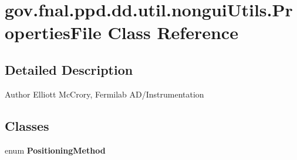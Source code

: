 \hypertarget{classgov_1_1fnal_1_1ppd_1_1dd_1_1util_1_1nonguiUtils_1_1PropertiesFile}{\section{gov.\-fnal.\-ppd.\-dd.\-util.\-nongui\-Utils.\-Properties\-File Class Reference}
\label{classgov_1_1fnal_1_1ppd_1_1dd_1_1util_1_1nonguiUtils_1_1PropertiesFile}
}


\subsection{Detailed Description}
\begin{DoxyAuthor}{Author}
Elliott Mc\-Crory, Fermilab A\-D/\-Instrumentation 
\end{DoxyAuthor}
\subsection*{Classes}
\begin{DoxyCompactItemize}
\item 
enum {\bfseries Positioning\-Method}
\end{DoxyCompactItemize}
